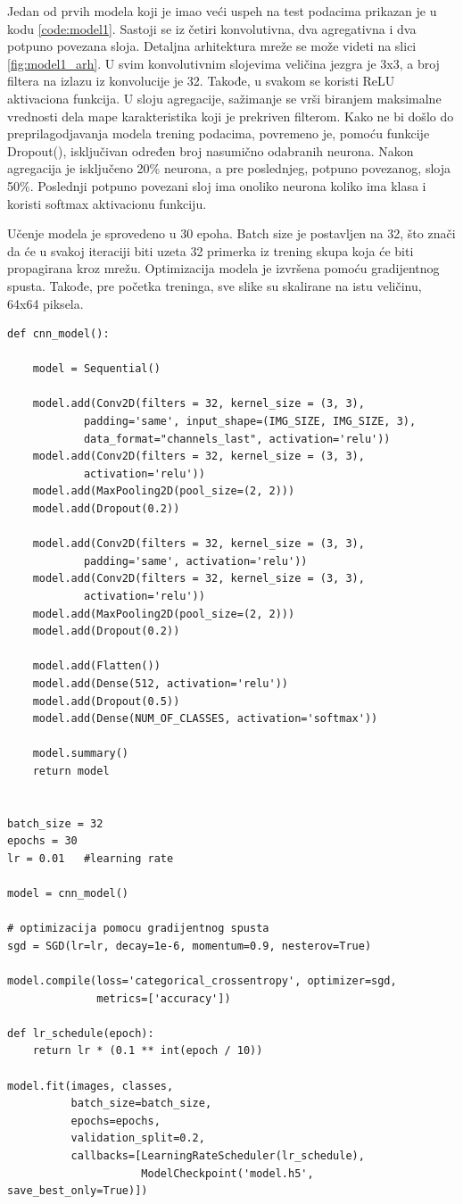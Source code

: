 \documentclass[a4paper]{article}
\begin{document}
Jedan od prvih modela koji je imao veći uspeh na test podacima prikazan je u kodu \ref{code:model1}. Sastoji se iz četiri konvolutivna, dva agregativna i dva potpuno povezana sloja. Detaljna arhitektura mreže se može videti na slici \ref{fig:model1_arh}. U svim konvolutivnim slojevima veličina jezgra je 3x3, a broj filtera na izlazu iz konvolucije je 32. Takođe, u svakom se koristi ReLU aktivaciona funkcija. U sloju agregacije, sažimanje se vrši biranjem maksimalne vrednosti dela mape karakteristika koji je prekriven filterom. Kako ne bi došlo do preprilagodjavanja modela trening podacima, povremeno je, pomoću funkcije Dropout(), isključivan određen broj nasumično odabranih neurona. Nakon agregacija je isključeno 20\% neurona, a pre poslednjeg, potpuno povezanog, sloja 50\%. Poslednji potpuno povezani sloj ima onoliko neurona koliko ima klasa i koristi softmax aktivacionu funkciju.

Učenje modela je sprovedeno u 30 epoha. Batch size je postavljen na 32, što znači da će u svakoj iteraciji biti uzeta 32 primerka iz trening skupa koja će biti propagirana kroz mrežu. Optimizacija modela je izvršena pomoću gradijentnog spusta. Takođe, pre početka treninga, sve slike su skalirane na istu veličinu, 64x64 piksela.


\begin{lstlisting}[caption={Model 1},frame=single, label=code:model1]
def cnn_model():
    
    model = Sequential()

    model.add(Conv2D(filters = 32, kernel_size = (3, 3), 
    		padding='same', input_shape=(IMG_SIZE, IMG_SIZE, 3), 
    		data_format="channels_last", activation='relu'))
    model.add(Conv2D(filters = 32, kernel_size = (3, 3), 
    		activation='relu'))
    model.add(MaxPooling2D(pool_size=(2, 2)))
    model.add(Dropout(0.2))

    model.add(Conv2D(filters = 32, kernel_size = (3, 3), 
    		padding='same', activation='relu'))
    model.add(Conv2D(filters = 32, kernel_size = (3, 3), 
    		activation='relu'))
    model.add(MaxPooling2D(pool_size=(2, 2)))
    model.add(Dropout(0.2))
    
    model.add(Flatten())
    model.add(Dense(512, activation='relu'))
    model.add(Dropout(0.5))
    model.add(Dense(NUM_OF_CLASSES, activation='softmax'))
    
    model.summary()
    return model


batch_size = 32
epochs = 30
lr = 0.01   #learning rate

model = cnn_model()

# optimizacija pomocu gradijentnog spusta
sgd = SGD(lr=lr, decay=1e-6, momentum=0.9, nesterov=True)

model.compile(loss='categorical_crossentropy', optimizer=sgd, 
			  metrics=['accuracy'])

def lr_schedule(epoch):
    return lr * (0.1 ** int(epoch / 10))

model.fit(images, classes,
          batch_size=batch_size,
          epochs=epochs,
          validation_split=0.2,
          callbacks=[LearningRateScheduler(lr_schedule), 
          			 ModelCheckpoint('model.h5', save_best_only=True)])
\end{lstlisting}
\end{document}
